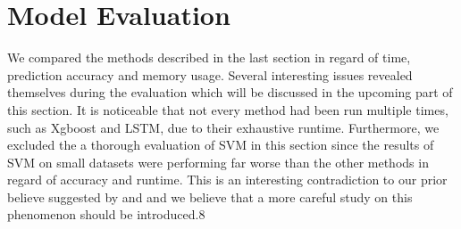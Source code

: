 \documentclass[letterpaper]{article} %
\begin{document}
\begin{table}[htb]
\caption{Example of TF/IDF Feature Matrix} %
\end{table}

\begin{table}[htb]
\caption{Example of Bag-of-word Feature Matrix} %
\end{table}

\section{Model Evaluation}
We compared the methods described in the last section in regard of time, prediction accuracy and memory usage. Several interesting issues revealed themselves during the evaluation which will be discussed in the upcoming part of this section. It is noticeable that not every method had been run multiple times, such as Xgboost and LSTM, due to their exhaustive runtime. Furthermore, we excluded the a thorough evaluation of SVM in this section since the results of SVM on small datasets were performing far worse than the other methods in regard of accuracy and runtime. This is an interesting contradiction to our prior believe suggested by \cite{rennie2001improving} and \cite{pang2002thumbs} and we believe that a more careful study on this phenomenon should be introduced.8
\end{document}
